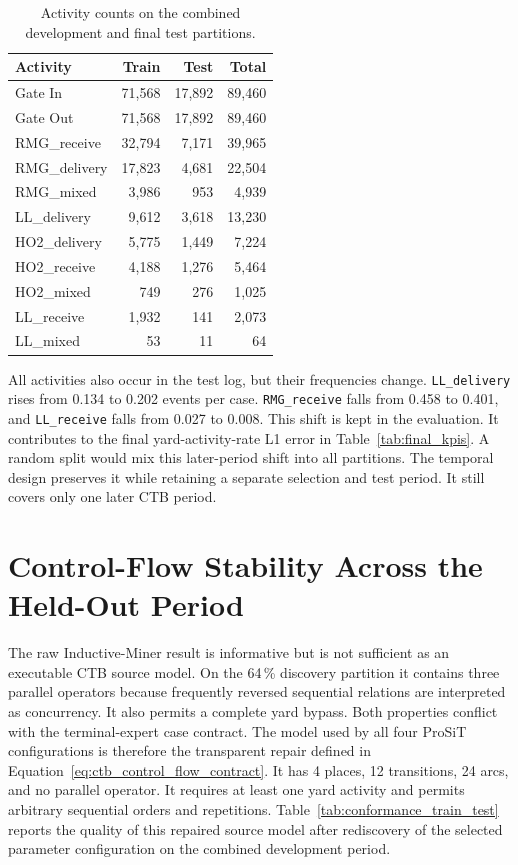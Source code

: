 \begin{table}[htbp]
\centering
\begin{tabular}{lrrr}
\toprule
\textbf{Activity} & \textbf{Train} & \textbf{Test} & \textbf{Total} \\
\midrule
Gate In       & 71,568 & 17,892 & 89,460 \\
Gate Out      & 71,568 & 17,892 & 89,460 \\
RMG\_receive  & 32,794 & 7,171  & 39,965 \\
RMG\_delivery & 17,823 & 4,681  & 22,504 \\
RMG\_mixed    & 3,986  & 953    & 4,939  \\
LL\_delivery  & 9,612  & 3,618  & 13,230 \\
HO2\_delivery & 5,775  & 1,449  & 7,224  \\
HO2\_receive  & 4,188  & 1,276  & 5,464  \\
HO2\_mixed    & 749    & 276    & 1,025  \\
LL\_receive   & 1,932  & 141    & 2,073  \\
LL\_mixed     & 53     & 11     & 64     \\
\bottomrule
\end{tabular}
\caption{Activity counts on the combined development and final test partitions.}
\label{tab:activity_counts_split}
\end{table}

All activities also occur in the test log, but their frequencies change.
\texttt{LL\_delivery} rises from 0.134 to 0.202 events per case.
\texttt{RMG\_receive} falls from 0.458 to 0.401, and
\texttt{LL\_receive} falls from 0.027 to 0.008. This shift is kept in the
evaluation. It contributes to the final yard-activity-rate L1 error in
Table~\ref{tab:final_kpis}. A random split would mix this later-period shift
into all partitions. The temporal design preserves it while retaining a
separate selection and test period. It still covers only one later CTB period.

\section{Control-Flow Stability Across the Held-Out Period}
\label{sec:results_process_discovery}

The raw Inductive-Miner result is informative but is not sufficient as an executable CTB source model. On the 64\,\% discovery partition it contains
three parallel operators because frequently reversed sequential relations are
interpreted as concurrency. It also permits a complete yard bypass. Both
properties conflict with the terminal-expert case contract. The model used by all four ProSiT configurations is therefore the transparent repair defined in
Equation~\ref{eq:ctb_control_flow_contract}. It has 4 places, 12 transitions,
24 arcs, and no parallel operator. It requires at least one yard activity and
permits arbitrary sequential orders and repetitions. Table~\ref{tab:conformance_train_test}
reports the quality of this repaired source model after rediscovery of the
selected parameter configuration on the combined development period.

